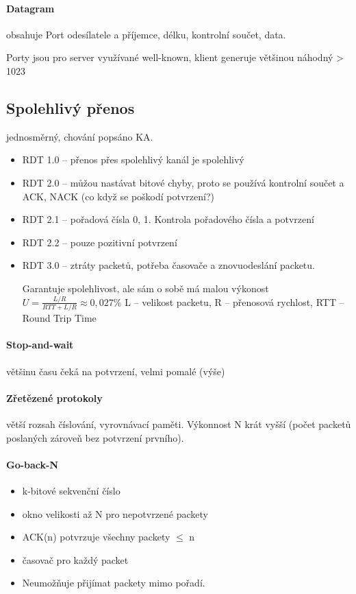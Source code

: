 \documentclass[a4paper, 11pt]{report}
\begin{document}
\paragraph{Datagram} obsahuje Port odesílatele a příjemce, délku, kontrolní součet, data.

Porty jsou pro server využívané well-known, klient generuje většinou náhodný > 1023

\subsection{Spolehlivý přenos}
jednosměrný, chování popsáno KA.

\begin{itemize}
	\item RDT 1.0 -- přenos přes spolehlivý kanál je spolehlivý
	\item RDT 2.0 -- můžou nastávat bitové chyby, proto se používá kontrolní součet a ACK, NACK (co když se poškodí potvrzení?)
	\item RDT 2.1 -- pořadová čísla 0, 1. Kontrola pořadového čísla a potvrzení
	\item RDT 2.2 -- pouze pozitivní potvrzení
	\item RDT 3.0 -- ztráty packetů, potřeba časovače a znovuodeslání packetu.
	
	Garantuje spolehlivost, ale sám o sobě má malou výkonost $U = \frac{L/R}{RTT+L/R} \approx 0,027 \%$ L -- velikost packetu, R -- přenosová rychlost, RTT -- Round Trip Time
\end{itemize}

\paragraph{Stop-and-wait} většinu času čeká na potvrzení, velmi pomalé (výše)

\paragraph{Zřetězené protokoly} větší rozsah číslování, vyrovnávací paměti. Výkonnost N krát vyšší (počet packetů poslaných zároveň bez potvrzení prvního).

\paragraph{Go-back-N}
\begin{itemize}
	\item k-bitové sekvenční číslo
	\item okno velikosti až N pro nepotvrzené packety
	\item ACK(n) potvrzuje všechny packety $ \leq $ n
	\item časovač pro každý packet
	\item Neumožňuje přijímat packety mimo pořadí.
\end{itemize}
\end{document}
